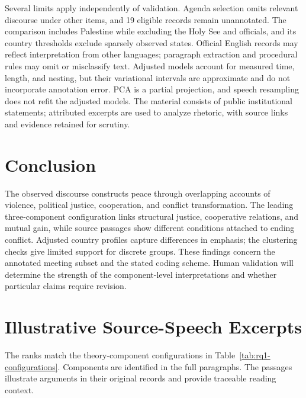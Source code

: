 \documentclass[sigconf,review,anonymous,balance=false]{acmart}
\begin{document}
Several limits apply independently of validation. Agenda selection omits
relevant discourse under other items, and 19 eligible records remain
unannotated. The comparison includes Palestine while excluding the Holy See and officials, and
its country thresholds exclude sparsely observed states. Official English
records may reflect interpretation from other languages; paragraph extraction
and procedural rules may omit or misclassify text. Adjusted models account
for measured time, length, and nesting, but their variational intervals are
approximate and do not incorporate annotation error. PCA is a partial
projection, and speech resampling does not refit the adjusted models.
The material consists of public institutional statements; attributed
excerpts are used to analyze rhetoric, with source links and evidence
retained for scrutiny.

\section{Conclusion}
The observed discourse constructs peace through overlapping accounts of
violence, political justice, cooperation, and conflict transformation.
The leading three-component configuration links structural justice, cooperative
relations, and mutual gain, while source passages show different conditions
attached to ending conflict. Adjusted country profiles capture differences
in emphasis; the clustering checks give limited support for discrete groups.
These findings concern the annotated meeting subset and the stated coding
scheme. Human validation will determine the strength of the component-level
interpretations and whether particular claims require revision.

\FloatBarrier



\appendix
\section{Illustrative Source-Speech Excerpts}
The ranks match the theory-component configurations in Table~\ref{tab:rq1-configurations}.
Components are identified in the full paragraphs. The passages illustrate arguments
in their original records and provide traceable reading context.

\end{document}

